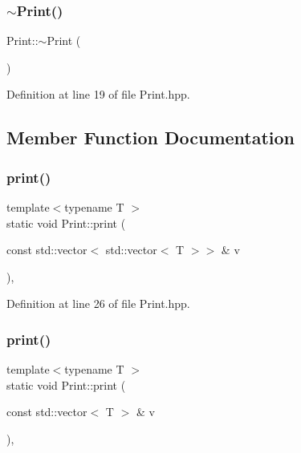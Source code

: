\mbox{\label{class_print_afe336c40d17eeccba970a1db714da1b5}} 
\subsubsection{\texorpdfstring{$\sim$Print()}{~Print()}}
{\footnotesize\ttfamily Print\+::$\sim$\+Print (\begin{DoxyParamCaption}{ }\end{DoxyParamCaption})\hspace{0.3cm}{\ttfamily [inline]}}



Definition at line 19 of file Print.\+hpp.



\subsection{Member Function Documentation}
\mbox{\label{class_print_ac634af53bf8c46bf58a8e538d883507d}} 
\subsubsection{\texorpdfstring{print()}{print()}\hspace{0.1cm}{\footnotesize\ttfamily [1/4]}}
{\footnotesize\ttfamily template$<$typename T $>$ \\
static void Print\+::print (\begin{DoxyParamCaption}\item[{const std\+::vector$<$ std\+::vector$<$ T $>$$>$ \&}]{v }\end{DoxyParamCaption})\hspace{0.3cm}{\ttfamily [inline]}, {\ttfamily [static]}}



Definition at line 26 of file Print.\+hpp.

\mbox{\label{class_print_a25829c4ccba037ef74becfa62d6df8e6}} 
\subsubsection{\texorpdfstring{print()}{print()}\hspace{0.1cm}{\footnotesize\ttfamily [2/4]}}
{\footnotesize\ttfamily template$<$typename T $>$ \\
static void Print\+::print (\begin{DoxyParamCaption}\item[{const std\+::vector$<$ T $>$ \&}]{v }\end{DoxyParamCaption})\hspace{0.3cm}{\ttfamily [inline]}, {\ttfamily [static]}}



